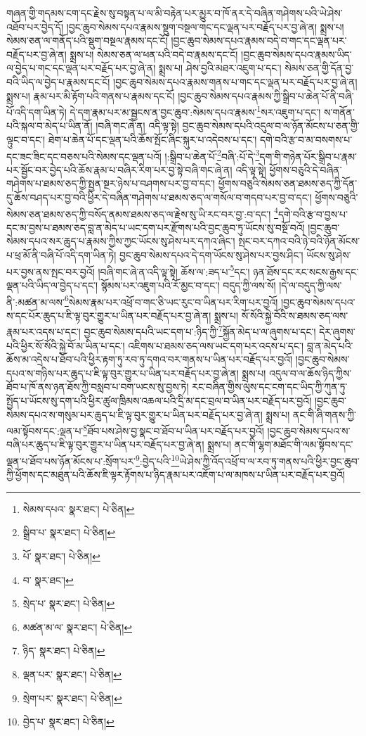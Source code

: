 གཞན་གྱི་གདམས་ངག་དང་རྗེས་སུ་བསྟན་པ་ལ་མི་བརྟེན་པར་མྱུར་བ་ཁོ་ནར་དེ་བཞིན་གཤེགས་པའི་ཡེ་ཤེས་འཐོབ་པར་བྱེད་དོ། །བྱང་ཆུབ་སེམས་དཔའ་རྣམས་སྡུག་བསྔལ་གང་དང་ལྡན་པར་བརྗོད་པར་བྱ་ཞེ་ན། སྨྲས་པ། སེམས་ཅན་ལ་གནོད་པའི་སྡུག་བསྔལ་རྣམས་དང་ངོ། །བྱང་ཆུབ་སེམས་དཔའ་རྣམས་བདེ་བ་གང་དང་ལྡན་པར་བརྗོད་པར་བྱ་ཞེ་ན། སྨྲས་པ། སེམས་ཅན་ལ་ཕན་པའི་བདེ་བ་རྣམས་དང་ངོ། །བྱང་ཆུབ་སེམས་དཔའ་རྣམས་ཡིད་ལ་བྱེད་པ་གང་དང་ལྡན་པར་བརྗོད་པར་བྱ་ཞེ་ན། སྨྲས་པ། ཤེས་བྱའི་མཐར་འཇུག་པ་དང་། སེམས་ཅན་གྱི་དོན་བྱ་བའི་ཡིད་ལ་བྱེད་པ་རྣམས་དང་ངོ། །བྱང་ཆུབ་སེམས་དཔའ་རྣམས་གནས་པ་གང་དང་ལྡན་པར་བརྗོད་པར་བྱ་ཞེ་ན། སྨྲས་པ། རྣམ་པར་མི་རྟོག་པའི་གནས་པ་རྣམས་དང་ངོ། །བྱང་ཆུབ་སེམས་དཔའ་རྣམས་ཀྱི་སྒྲིབ་པ་ཆེན་པོ་ནི་བཞི་པོ་འདི་དག་ཡིན་ཏེ། དེ་དག་རྣམ་པར་མ་སྦྱངས་ན་བྱང་ཆུབ་:སེམས་དཔའ་རྣམས་\footnote{སེམས་དཔའ་  སྣར་ཐང་།  པེ་ཅིན། }སར་འཇུག་པ་དང་། ས་གནོན་པའི་སྐལ་བ་མེད་པ་ཡིན་ནོ། །བཞི་གང་ཞེ་ན། འདི་ལྟ་སྟེ། བྱང་ཆུབ་སེམས་དཔའི་འདུལ་བ་ལ་ཉོན་མོངས་པ་ཅན་གྱི་ལྟུང་བ་དང་། ཐེག་པ་ཆེན་པོ་དང་ལྡན་པའི་ཆོས་སྤོང་ཞིང་སྐུར་པ་འདེབས་པ་དང་། དགེ་བའི་རྩ་བ་མ་བསགས་པ་དང་ཟང་ཟིང་དང་བཅས་པའི་སེམས་དང་ལྡན་པའོ། །:སྒྲིབ་པ་ཆེན་པོ་\footnote{སྒྲིབ་པ་  སྣར་ཐང་།  པེ་ཅིན། }བཞི་:པོ་དེ་\footnote{པོ་  སྣར་ཐང་།  པེ་ཅིན། }དག་གི་གཉེན་པོར་སྒྲིབ་པ་རྣམ་པར་སྦྱོང་བར་བྱེད་པའི་ཆོས་རྣམ་པ་བཞིར་རིག་པར་བྱ་སྟེ་བཞི་གང་ཞེ་ན། འདི་ལྟ་སྟེ། ཕྱོགས་བཅུའི་དེ་བཞིན་གཤེགས་པ་ཐམས་ཅད་ཀྱི་སྤྱན་སྔར་ཉེས་པ་བཤགས་པར་བྱ་བ་དང་། ཕྱོགས་བཅུའི་སེམས་ཅན་ཐམས་ཅད་ཀྱི་དོན་དུ་ཆོས་བཤད་པར་བྱ་བའི་ཕྱིར་དེ་བཞིན་གཤེགས་པ་ཐམས་ཅད་ལ་གསོལ་བ་གདབ་པར་བྱ་བ་དང་། ཕྱོགས་བཅུའི་སེམས་ཅན་ཐམས་ཅད་ཀྱི་བསོད་ནམས་ཐམས་ཅད་ལ་རྗེས་སུ་ཡི་རང་བར་བྱ་:བ་དང་། \footnote{བ་  སྣར་ཐང་། }དགེ་བའི་རྩ་བ་བྱས་པ་དང་མ་བྱས་པ་ཐམས་ཅད་བླ་ན་མེད་པ་ཡང་དག་པར་རྫོགས་པའི་བྱང་ཆུབ་ཏུ་ཡོངས་སུ་བསྔོ་བའོ། །བྱང་ཆུབ་སེམས་དཔའ་སར་ཆུད་པ་རྣམས་ཀྱིས་ཀྱང་ཡོངས་སུ་ཤེས་པར་དཀའ་ཞིང་། སྤང་བར་དཀའ་བའི་ཉེ་བའི་ཉོན་མོངས་པ་ཕྲ་མོ་ནི་བཞི་པོ་འདི་དག་ཡིན་ཏེ། བྱང་ཆུབ་སེམས་དཔའ་དེ་དག་ཡོངས་སུ་ཤེས་པར་བྱས་ཤིང་། ཡོངས་སུ་ཤེས་པར་བྱས་ནས་སྤང་བར་བྱའོ། །བཞི་གང་ཞེ་ན་འདི་ལྟ་སྟེ། ཆོས་ལ་:ཟད་པ་\footnote{སྲེད་པ་  སྣར་ཐང་།  པེ་ཅིན། }དང་། ཉན་ཐོས་དང་རང་སངས་རྒྱས་དང་ལྡན་པའི་ཡིད་ལ་བྱེད་པ་དང་། སྙོམས་པར་འཇུག་པའི་རོ་མྱང་བ་དང་། བདུད་ཀྱི་ལས་སོ། །དེ་ལ་བདུད་ཀྱི་ལས་ནི་:མཚན་མ་ལས་\footnote{མཚན་མ་ལ་  སྣར་ཐང་།  པེ་ཅིན། }སེམས་རྣམ་པར་འཕྲོ་བ་གང་ཅི་ཡང་རུང་བ་ཡིན་པར་རིག་པར་བྱའོ། །བྱང་ཆུབ་སེམས་དཔའ་ས་དང་པོར་ཆུད་པ་ཇི་ལྟ་བུར་གྱུར་པ་ཡིན་པར་བརྗོད་པར་བྱ་ཞེ་ན། སྨྲས་པ། སོ་སོའི་སྐྱེ་བོའི་ས་ཐམས་ཅད་ལས་རྣམ་པར་འདས་པ་དང་། བྱང་ཆུབ་སེམས་དཔའི་ཡང་དག་པ་:ཉིད་ཀྱི་\footnote{ཉིད་  སྣར་ཐང་།  པེ་ཅིན། }སྐྱོན་མེད་པ་ལ་ཞུགས་པ་དང་། དེར་ཞུགས་པའི་ཕྱིར་སོ་སོའི་སྐྱེ་བོ་མ་ཡིན་པ་དང་། འཇིགས་པ་ཐམས་ཅད་ལས་ཡང་དག་པར་འདས་པ་དང་། བླ་ན་མེད་པའི་ཆོས་མ་འདྲེས་པ་ཐོབ་པའི་ཕྱིར་རྟག་ཏུ་རབ་ཏུ་དགའ་བར་གནས་པ་ཡིན་པར་བརྗོད་པར་བྱའོ། །བྱང་ཆུབ་སེམས་དཔའ་ས་གཉིས་པར་ཆུད་པ་ཇི་ལྟ་བུར་གྱུར་པ་ཡིན་པར་བརྗོད་པར་བྱ་ཞེ་ན། སྨྲས་པ། འདུལ་བ་ལ་ཆོས་ཉིད་ཀྱིས་ཐོབ་པ་ཁོ་ནས་ཉན་ཐོས་ཀྱི་བསླབ་པ་བག་ཡངས་སུ་བྱས་ཏེ། རང་བཞིན་གྱིས་ལུས་དང་ངག་དང་ཡིད་ཀྱི་ཀུན་ཏུ་སྤྱོད་པ་ཡོངས་སུ་དག་པའི་ཕྱིར་ཚུལ་ཁྲིམས་འཆལ་པའི་དྲི་མ་དང་བྲལ་བ་ཡིན་པར་བརྗོད་པར་བྱའོ། །བྱང་ཆུབ་སེམས་དཔའ་ས་གསུམ་པར་ཆུད་པ་ཇི་ལྟ་བུར་གྱུར་པ་ཡིན་པར་བརྗོད་པར་བྱ་ཞེ་ན། སྨྲས་པ། ནང་གི་ཞི་གནས་ཀྱི་ལམ་སྟོབས་དང་:ལྡན་པ་\footnote{ལྡན་པར་  སྣར་ཐང་།  པེ་ཅིན། }ཐོབ་པས་ཤེས་བྱ་སྣང་བ་ཐོབ་པ་ཡིན་པར་བརྗོད་པར་བྱའོ། །བྱང་ཆུབ་སེམས་དཔའ་ས་བཞི་པར་ཆུད་པ་ཇི་ལྟ་བུར་གྱུར་པ་ཡིན་པར་བརྗོད་པར་བྱ་ཞེ་ན། སྨྲས་པ། ནང་གི་ལྷག་མཐོང་གི་ལམ་སྟོབས་དང་ལྡན་པ་ཐོབ་པས་ཉོན་མོངས་པ་:སྲོག་པར་\footnote{སྲེག་པར་  སྣར་ཐང་།  པེ་ཅིན། }:བྱེད་པའི་\footnote{བྱེད་པ་  སྣར་ཐང་།  པེ་ཅིན། }ཡེ་ཤེས་ཀྱི་འོད་འཕྲོ་བ་ལ་རབ་ཏུ་གནས་པའི་ཕྱིར་བྱང་ཆུབ་ཀྱི་ཕྱོགས་དང་མཐུན་པའི་ཆོས་ཇི་ལྟར་རྟོགས་པ་ཉིད་རྣམ་པར་འཇོག་པ་ལ་མཁས་པ་ཡིན་པར་བརྗོད་པར་བྱའོ། 